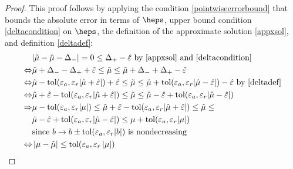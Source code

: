 \documentclass{iitthesis}
\begin{document}
 \begin{proof}
 This proof follows by applying the condition \eqref{pointwiseerrorbound}  that bounds the absolute error in terms of $\heps$, upper bound condition \eqref{deltacondition} on $\heps$, the definition of the approximate solution \eqref{appxsol}, and definition \eqref{deltadef}:
\begin{align*}
&|\tilde{\mu} -\hat{\mu} - \Delta_{-}| = 0 \leq \Delta_{+}- \hat{\varepsilon}  \text{ by } \eqref{appxsol} \text{ and } \eqref{deltacondition} \\ 
\Leftrightarrow 
&\hat{\mu}+\Delta_- - \Delta_{+} + \hat{\varepsilon} \leq \tilde{\mu}  \leq \hat{\mu} +\Delta_{-}+\Delta_{+}-\hat{\varepsilon} \\ \Leftrightarrow 
&\hat{\mu} -\text{tol} (\varepsilon_a, \varepsilon_r |\hat{\mu} +\hat{\varepsilon}|)+ \hat{\varepsilon} \leq \tilde{\mu}  \leq \hat{\mu}  +\text{tol} (\varepsilon_a, \varepsilon_r |\hat{\mu} -\hat{\varepsilon} |)-\hat{\varepsilon}  \text{ by } \eqref{deltadef}\\
\Leftrightarrow 
&\hat{\mu} + \hat{\varepsilon}  -\text{tol} (\varepsilon_a, \varepsilon_r |\hat{\mu} +\hat{\varepsilon} |) \leq \tilde{\mu}  \leq \hat{\mu} -\hat{\varepsilon} +\text{tol} (\varepsilon_a, \varepsilon_r |\hat{\mu} -\hat{\varepsilon} |) \\
\Rightarrow &
\mu -\text{tol} (\varepsilon_a, \varepsilon_r |\mu|) \leq\hat{\mu} + \hat{\varepsilon}  -\text{tol} (\varepsilon_a, \varepsilon_r |\hat{\mu} +\hat{\varepsilon} |) \leq \tilde{\mu}  \leq \\
& \hat{\mu} -\hat{\varepsilon} +\text{tol} (\varepsilon_a, \varepsilon_r |\hat{\mu} -\hat{\varepsilon} |)  \leq \mu+\text{tol} (\varepsilon_a, \varepsilon_r |\mu|) \\
& \text{since } b \to b \pm \text{tol} (\varepsilon_a,\varepsilon_r |b|) \text{ is nondecreasing}\\ 
\Leftrightarrow &
\left \lvert \mu-\tilde{\mu} \right \rvert \leq \text{tol} (\varepsilon_a, \varepsilon_r \left \lvert \mu \right \rvert) 
\end{align*}
\end{proof}
\end{document}
